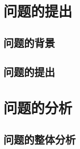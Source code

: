 \documentclass{MathorCupmodeling}
\begin{document}
	\begin{abstract}
		请使用 \TeX Live 2019，XeLaTeX 编译，请选用支持 UTF­-8 编码的编辑器。

		使用者需要有一定的 \LaTeX{} 的使用经验（{\heiti 任务期三个月以内不建议使用 \LaTeX}，因此本文没有介绍基础使用），至少要会使用常用宏包的一些功能，比如参考文献，数学公式，图片使用，列表环境等等。模板已经添加了常用的宏包，无需用户再额外添加。

		本模板
		\begin{itemize}
			\item 定义了几个宏 \lstinline|\def\ee{\mathrm{e}},\def\ii{\mathrm{i}},\def\leq{\leqslant},\def\geq{\geqslant}| 方便使用；
			\item 图片应放在 \lstinline|figure| 文件夹中；
			\item 定制了 matlab 和 python 代码环境，使用方法：\lstinline|\begin{matlab} content \end{matlab}| 和 \lstinline|\begin{python} content \end{python}|；
			\item 加载了 \lstinline|cleveref| 宏包，使用方法：\lstinline|\cref{label}|。
		\end{itemize}
		其它的就是跟普通的 \lstinline|ctexart| 使用方法一样。
	
		欢迎到 \url{https://wenda.latexstudio.net/} 和 \url{https://github.com/CTeX-org/forum} 提问，注意提供 MWE，提问步骤可参考 \url{https://paste.ubuntu.com/p/wRq2mFCvWC/}。
	\end{abstract}
	\tableofcontents\newpage
	\section{问题的提出}
	\zhlipsum*[2]
	\subsection{问题的背景}
	\zhlipsum*[3]
	\subsection{问题的提出}
	\zhlipsum*[4]

	\section{问题的分析}
	\zhlipsum*[5]
	\subsection{问题的整体分析}
	\zhlipsum*[6]
\end{document}
